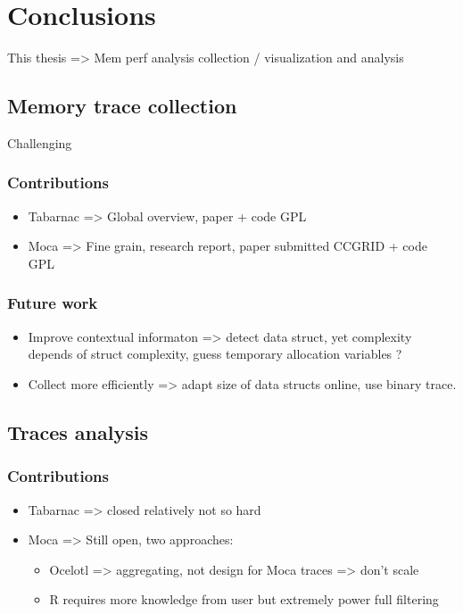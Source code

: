 \chapter{Conclusions}
\label{chap:cncl}

This thesis => Mem perf analysis collection / visualization and analysis

\section{Memory trace collection}

Challenging

\subsection{Contributions}

\begin{itemize}
    \item Tabarnac => Global overview, paper + code GPL
    \item  Moca => Fine grain, research report, paper submitted CCGRID + code GPL
\end{itemize}

\subsection{Future work}

\begin{itemize}
    \item Improve contextual informaton => detect data struct, yet complexity depends of struct complexity, guess temporary allocation variables ?
    \item  Collect more efficiently => adapt size of data structs online, use binary trace.
\end{itemize}

\section{Traces analysis}

\subsection{Contributions}

\begin{itemize}
    \item  Tabarnac => closed relatively not so hard
    \item Moca => Still open, two approaches:
        \begin{itemize}
            \item Ocelotl => aggregating, not design for Moca traces => don't scale
            \item R requires more knowledge from user but extremely power full filtering
        \end{itemize}
\end{itemize}


